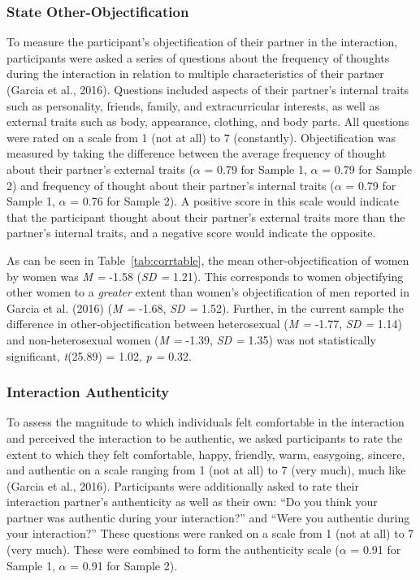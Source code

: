 \documentclass[man]{apa6}
\begin{document}
\subsubsection{State
Other-Objectification}\label{state-other-objectification}

To measure the participant's objectification of their partner in the
interaction, participants were asked a series of questions about the
frequency of thoughts during the interaction in relation to multiple
characteristics of their partner (Garcia et al., 2016). Questions
included aspects of their partner's internal traits such as personality,
friends, family, and extracurricular interests, as well as external
traits such as body, appearance, clothing, and body parts. All questions
were rated on a scale from 1 (not at all) to 7 (constantly).
Objectification was measured by taking the difference between the
average frequency of thought about their partner's external traits
(\(\alpha\) = 0.79 for Sample 1, \(\alpha\) = 0.79 for Sample 2) and
frequency of thought about their partner's internal traits (\(\alpha\) =
0.79 for Sample 1, \(\alpha\) = 0.76 for Sample 2). A positive score in
this scale would indicate that the participant thought about their
partner's external traits more than the partner's internal traits, and a
negative score would indicate the opposite.

As can be seen in Table~\ref{tab:corrtable}, the mean
other-objectification of women by women was \emph{M =} -1.58 (\emph{SD
=} 1.21). This corresponds to women objectifying other women to a
\emph{greater} extent than women's objectification of men reported in
Garcia et al. (2016) (\emph{M =} -1.68, \emph{SD =} 1.52). Further, in
the current sample the difference in other-objectification between
heterosexual (\emph{M =} -1.77, \emph{SD =} 1.14) and non-heterosexual
women (\emph{M =} -1.39, \emph{SD =} 1.35) was not statistically
significant, \emph{t}(25.89) = 1.02, \emph{p =} 0.32.

\subsubsection{Interaction Authenticity}\label{interaction-authenticity}

To assess the magnitude to which individuals felt comfortable in the
interaction and perceived the interaction to be authentic, we asked
participants to rate the extent to which they felt comfortable, happy,
friendly, warm, easygoing, sincere, and authentic on a scale ranging
from 1 (not at all) to 7 (very much), much like (Garcia et al., 2016).
Participants were additionally asked to rate their interaction partner's
authenticity as well as their own: \enquote{Do you think your partner
was authentic during your interaction?} and \enquote{Were you authentic
during your interaction?} These questions were ranked on a scale from 1
(not at all) to 7 (very much). These were combined to form the
authenticity scale (\(\alpha\) = 0.91 for Sample 1, \(\alpha\) = 0.91
for Sample 2).
\end{document}
